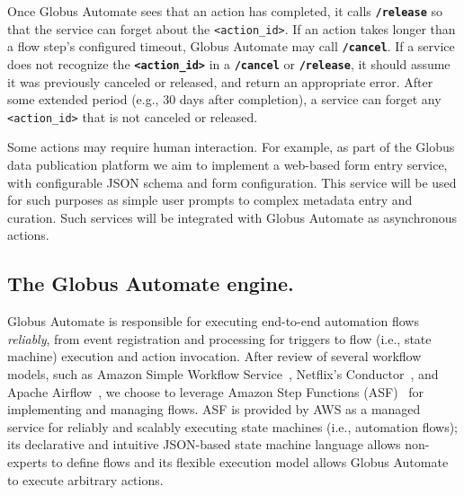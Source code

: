 \documentclass{aip-cp}
\newcommand\code[1]{{\tt \footnotesize #1}}
\newcommand\darkcode[1]{\code{\textbf{#1}}}
\begin{document}
Once Globus Automate sees that an action has completed, it calls \darkcode{/release} 
so that the service can forget about the \code{<action\_id>}.  
If an action takes longer than a flow step's configured timeout,
Globus Automate may call \darkcode{/cancel}. 
If a service does not recognize the \darkcode{<action\_id>} in a \darkcode{/cancel} or 
\darkcode{/release}, 
it should assume it was previously canceled or released, and return an appropriate error. 
After some extended period (e.g., 30 days after completion),
a service can forget any \code{<action\_id>} that is not canceled or released. 

Some actions may require human interaction.  For example, as part of 
the Globus data publication platform we aim to implement 
a web-based form entry service, 
with configurable JSON schema and form configuration. 
This service will be used for such purposes 
as simple user prompts to complex metadata entry and curation.
Such services will be integrated with Globus Automate as asynchronous actions.

\subsection{The Globus Automate engine.}
Globus Automate is responsible for executing end-to-end automation flows \emph{reliably}, 
from event registration and processing for triggers to
flow (i.e., state machine) execution and action invocation. 
After review of several workflow models, such as Amazon Simple
Workflow Service~\cite{AmazonSWF}, Netflix's Conductor~\cite{conductor}, and Apache 
Airflow~\cite{airflow}, 
we choose to leverage
Amazon Step Functions (ASF)~\cite{AmazonSteps} for implementing and managing flows.
ASF is provided by AWS as a managed service for reliably 
and scalably executing state machines (i.e., automation flows);
its declarative and intuitive JSON-based state machine language allows non-experts
to define
flows and its flexible execution model allows Globus Automate
to execute arbitrary actions.
\end{document}

